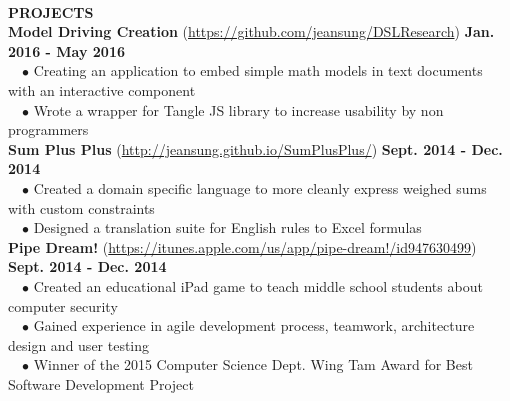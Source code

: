 \documentclass[11pt]{article}
\newcommand{\wrapTitle}[1]{{\sectionNL \textbf{\Large #1}} \sectionNL}
\newcommand{\sectionNL}{~\\[1pt]}
\newcommand{\customtab}{$\hspace{10pt} \bullet \hspace{2pt}$}
\newcommand{\JudgeNudge}{\hspace{4pt}}
\newcommand{\rightAlign}{\hfill}
\begin{document}
\begin{flushleft}
\wrapTitle{PROJECTS}

\textbf{Model Driving Creation} (\url{https://github.com/jeansung/DSLResearch}) \rightAlign \textbf{Jan. 2016 - May 2016} \\
\customtab Creating an application to embed simple math models in text documents with an interactive component \\
\customtab Wrote a wrapper for Tangle JS library to increase usability by non programmers \\

\textbf{Sum Plus Plus} (\url{http://jeansung.github.io/SumPlusPlus/}) \rightAlign \textbf{Sept. 2014 - Dec. 2014} \\
\customtab Created a domain specific language to more cleanly express weighed sums with custom constraints \\
\customtab Designed a translation suite for English rules to Excel formulas \\

\textbf{Pipe Dream!} (\url{https://itunes.apple.com/us/app/pipe-dream!/id947630499})  \rightAlign \textbf{Sept. 2014 - Dec. 2014} \\
\customtab Created an educational iPad game to teach middle school students about computer security\\
\customtab Gained experience in agile development process, teamwork, architecture design and user testing \\
\customtab Winner of the 2015 Computer Science Dept. Wing Tam Award for Best Software Development Project 


 


\end{flushleft}
\end{document}
